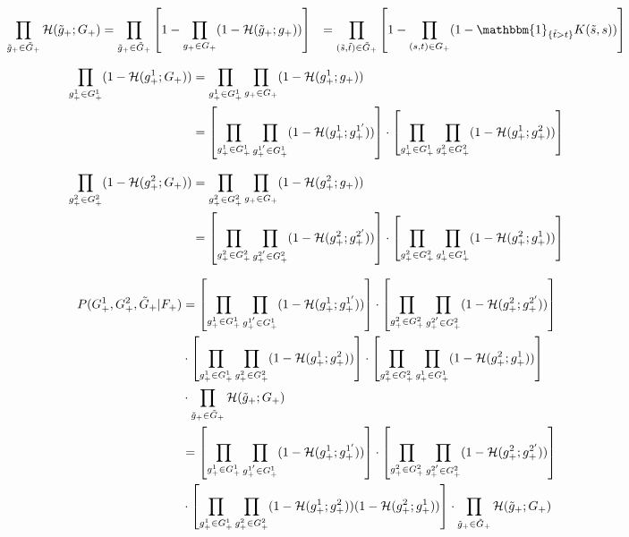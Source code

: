\documentclass[12pt]{article}
\begin{document}
\begin{align*}
\prod_{\tilde{g}_+ \in \tilde{G}_+} \mH (\tilde{g}_+ ; G_+) &= \prod_{\tilde{g}_+ \in \tilde{G}_+} \left[ 1 -        \prod_{g_+ \in G_+}  (1 - \mH (\tilde{g}_+ ; g_+) ) \right]
&= \prod_{(\tilde{s}, \tilde{t}) \in \tilde{G}_+} \left[ 1 - \prod_{(s, t) \in G_+}  (1 - \mathbbm{1}_{\{ \tilde{t} > t \} } K(\tilde{s}, s)) \right]
\end{align*}

\begin{align*}
\prod_{g^1_+ \in G^1_+} ( 1- {\mathcal H} (g_+^1 ; G_+) ) &= \prod_{g^1_+ \in G^1_+} \prod_{g_+ \in G_+} ( 1- {\mathcal H} (g_+^1 ; g_+) ) \\ 
&= \left[ \prod_{g^1_+ \in G^1_+} \prod_{g^{1'}_+ \in G^1_+} ( 1- {\mathcal H} (g_+^1 ; g^{1'}_+) ) \right] \cdot 
 \left[ \prod_{g^1_+ \in G^1_+} \prod_{g^2_+ \in G^2_+} ( 1- {\mathcal H} (g_+^1 ; g^2_+) ) \right]
\end{align*}

\begin{align*}
\prod_{g^2_+ \in G^2_+} ( 1- {\mathcal H} (g_+^2 ; G_+) ) &= \prod_{g^2_+ \in G^2_+} \prod_{g_+ \in G_+} ( 1- {\mathcal H} (g_+^2 ; g_+) ) \\ 
&= \left[ \prod_{g^2_+ \in G^2_+} \prod_{g^{2'}_+ \in G^2_+} ( 1- {\mathcal H} (g_+^2 ; g^{2'}_+) ) \right] \cdot 
 \left[ \prod_{g^2_+ \in G^2_+} \prod_{g^1_+ \in G^1_+} ( 1- {\mathcal H} (g_+^2 ; g^1_+) ) \right]
\end{align*}


\begin{align*}
P(G_+^1, G_+^2, \tilde{G}_+ | F_+) &= \left[ \prod_{g^1_+ \in G^1_+} \prod_{g^{1'}_+ \in G^1_+} ( 1- {\mathcal H} (g_+^1 ; g^{1'}_+) ) \right] \cdot \left[ \prod_{g^2_+ \in G^2_+} \prod_{g^{2'}_+ \in G^2_+} ( 1- {\mathcal H} (g_+^2 ; g^{2'}_+) ) \right] \\ 
&\cdot 
 \left[ \prod_{g^1_+ \in G^1_+} \prod_{g^2_+ \in G^2_+} ( 1- {\mathcal H} (g_+^1 ; g^2_+) ) \right] \cdot 
 \left[ \prod_{g^2_+ \in G^2_+} \prod_{g^1_+ \in G^1_+} ( 1- {\mathcal H} (g_+^2 ; g^1_+) ) \right] \\  
&\cdot \prod_{\tilde{g}_+ \in \tilde{G}_+} {\mathcal H} (\tilde{g}_+ ; G_+)\\
&= \left[ \prod_{g^1_+ \in G^1_+} \prod_{g^{1'}_+ \in G^1_+} ( 1- {\mathcal H} (g_+^1 ; g^{1'}_+) ) \right] \cdot \left[ \prod_{g^2_+ \in G^2_+} \prod_{g^{2'}_+ \in G^2_+} ( 1- {\mathcal H} (g_+^2 ; g^{2'}_+) ) \right] \\ 
&\cdot  
\left[ \prod_{g^1_+ \in G^1_+} \prod_{g^2_+ \in G^2_+} ( 1- {\mathcal H} (g_+^1 ; g^2_+) )( 1- {\mathcal H} (g_+^2 ; g^1_+) )  \right] \cdot \prod_{\tilde{g}_+ \in \tilde{G}_+} {\mathcal H} (\tilde{g}_+ ; G_+)
\end{align*}
\end{document}
